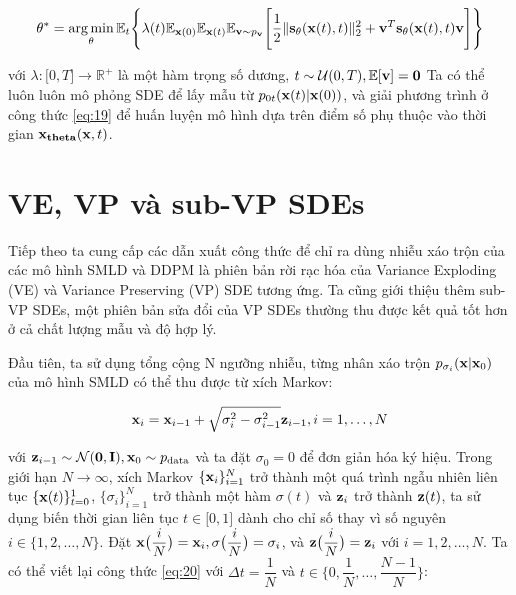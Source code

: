 \documentclass{article} %
\begin{document}
\begin{equation} \label{eq:19}
    \bold{\theta}^{\ast} = \operatorname*{arg\,min}_{\bold{\theta}} \mathbb{E}_t \Bigg \lbrace \lambda (t) \mathbb{E}_{\bold{x}(0)} \mathbb{E}_{\bold{x}(t)} \mathbb{E}_{\bold{v} \sim p_{\bold{v}}} \Bigg \lbrack \dfrac{1}{2} \lVert \bold{s}_{\bold{\theta}} (\bold{x}(t), t) \rVert_2^2 + \bold{v}^T \bold{s}_{\bold{\theta}} (\bold{x}(t), t) \bold{v} \Bigg \rbrack \Bigg \rbrace
\end{equation}

với $\lambda: \lbrack 0, T \rbrack \rightarrow \mathbb{R}^{+}$ là một hàm trọng số dương, $t \sim \mathcal{U}(0, T), \mathbb{E} \lbrack \bold{v} \rbrack = \bold{0}$
Ta có thể luôn luôn mô phỏng SDE để lấy mẫu từ $p_{0t}(\bold{x}(t) \vert \bold{x}(0))$, và giải phương trình ở công thức \ref{eq:19} để huấn luyện mô hình dựa trên điểm số phụ thuộc vào thời gian $\bold{x}_{\bold{theta}}(\bold{x}, t)$.

\section{VE, VP và sub-VP SDEs} \label{B}

Tiếp theo ta cung cấp các dẫn xuất công thức để chỉ ra dùng nhiễu xáo trộn của các mô hình SMLD và DDPM là phiên bản rời rạc hóa của Variance Exploding (VE) và Variance Preserving (VP) SDE tương ứng.
Ta cũng giới thiệu thêm sub-VP SDEs, một phiên bản sửa đổi của VP SDEs thường thu được kết quả tốt hơn ở cả chất lượng mẫu và độ hợp lý.

Đầu tiên, ta sử dụng tổng cộng N ngưỡng nhiễu, từng nhân xáo trộn $p_{\sigma_i} (\bold{x} \vert \bold{x}_0)$ của mô hình SMLD có thể thu được từ xích Markov:

\begin{equation} \label{eq:20}
    \bold{x}_i = \bold{x}_{i-1} + \sqrt{\sigma_i^2 - \sigma_{i-1}^2} \bold{z}_{i-1}, i = 1, \dots, N
\end{equation}

với $\bold{z}_{i-1} \sim \mathcal{N}(\bold{0}, \bold{I}), \bold{x}_0 \sim p_{\mathrm{data}}$ và ta đặt $\sigma_0 = 0$ để đơn giản hóa ký hiệu.
Trong giới hạn $N \rightarrow \infty$, xích Markov $\lbrace \bold{x}_i \rbrace_{i=1}^N$ trở thành một quá trình ngẫu nhiên liên tục $\lbrace \bold{x}(t) \rbrace_{t=0}^1$,
$\lbrace \sigma_i \rbrace_{i=1}^N$ trở thành một hàm $\sigma(t)$ và $\bold{z}_i$ trở thành $\bold{z}(t)$, ta sử dụng biến thời gian liên tục $t \in \lbrack 0, 1 \rbrack$ dành cho chỉ số thay vì số nguyên $i \in \lbrace 1, 2, \dots, N \rbrace$.
Đặt $\bold{x} \big ( \dfrac{i}{N} \big)=\bold{x}_i, \sigma \big( \dfrac{i}{N} \big) = \sigma_i$,
và $\bold{z} \big ( \dfrac{i}{N} \big)=\bold{z}_i$ với $i = 1, 2, \dots, N$.
Ta có thể viết lại công thức \ref{eq:20} với $\Delta t = \dfrac{1}{N}$ và $t \in \lbrace 0, \dfrac{1}{N}, \dots, \dfrac{N-1}{N} \rbrace$:
\end{document}
